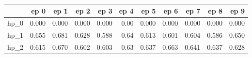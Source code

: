 \begin{tabular}{lrrrrrrrrrr}
\toprule
{} &   ep 0 &   ep 1 &   ep 2 &   ep 3 &  ep 4 &   ep 5 &   ep 6 &   ep 7 &   ep 8 &   ep 9 \\
\midrule
hp\_0 &  0.000 &  0.000 &  0.000 &  0.000 &  0.00 &  0.000 &  0.000 &  0.000 &  0.000 &  0.000 \\
hp\_1 &  0.655 &  0.681 &  0.628 &  0.588 &  0.64 &  0.613 &  0.601 &  0.604 &  0.586 &  0.650 \\
hp\_2 &  0.615 &  0.670 &  0.602 &  0.603 &  0.63 &  0.637 &  0.663 &  0.641 &  0.637 &  0.628 \\
\bottomrule
\end{tabular}
